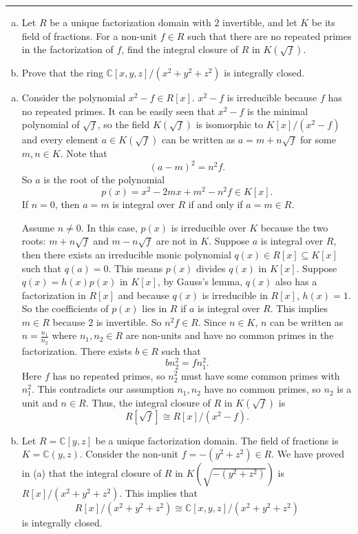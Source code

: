 \documentclass[letterpaper, 12pt]{article}
\begin{document}
\noindent\rule{7in}{2.8pt}
\begin{problem}{4}
\begin{enumerate}[(a)]
\item Let \(R\) be a unique factorization domain with \(2\) invertible, and let \(K\) be its field of fractions. For a non-unit \(f\in R\) such that there are no repeated primes in the factorization of \(f\), find the integral closure of \(R\) in \(K(\sqrt{f})\).
\item Prove that the ring \(\mathbb{C}[x,y,z]/(x^2+y^2+z^2)\) is integrally closed.
\end{enumerate}
\end{problem}
\begin{solution}
\begin{enumerate}[(a)]
\item Consider the polynomial \(x^2-f\in R[x]\). \(x^2-f\) is irreducible because \(f\) has no repeated primes. It can be easily seen that \(x^2-f\) is the minimal polynomial of \(\sqrt{f}\), so the field \(K(\sqrt{f})\) is isomorphic to \(K[x]/(x^2-f)\)  and every element \(a\in K(\sqrt{f})\) can be written as \(a=m+n\sqrt{f}\) for some \(m,n\in K\). Note that 
\[(a-m)^2=n^2f.\]
So \(a\) is the root of the polynomial 
\[p(x)=x^2-2mx+m^2-n^2f\in K[x].\]
If \(n=0\), then \(a=m\) is integral over \(R\) if and only if \(a=m\in R\). 

Assume \(n\neq 0\). In this case, \(p(x)\) is irreducible over \(K\) because the two roots: \(m+n\sqrt{f}\) and \(m-n\sqrt{f}\) are not in \(K\). Suppose \(a\) is integral over \(R\), then there exists an irreducible monic polynomial \(q(x)\in R[x]\subseteq K[x]\) such that \(q(a)=0\). This means \(p(x)\) divides \(q(x)\) in \(K[x]\). Suppose \(q(x)=h(x)p(x)\) in \(K[x]\), by Gauss's lemma, \(q(x)\) also has a factorization in \(R[x]\) and because \(q(x)\) is irreducible in \(R[x]\), \(h(x)=1\). So the coefficients of \(p(x)\) lies in \(R\) if \(a\) is integral over \(R\). This implies \(m\in R\) because \(2\) is invertible. So \(n^2f\in R\). Since \(n\in K\), \(n\) can be written as \(n=\frac{n_1}{n_2}\) where \(n_1,n_2\in R\) are non-units and have no common primes in the factorization. There exists \(b\in R\) such that 
\[bn_2^2=fn_1^2.\]
Here \(f\) has no repeated primes, so \(n_2^2\) must have some common primes with \(n_1^2\). This contradicts our assumption \(n_1,n_2\) have no common primes, so \(n_2\) is a unit and \(n\in R\). Thus, the integral closure of \(R\) in \(K(\sqrt{f})\) is 
\[R[\sqrt{f}]\cong R[x]/(x^2-f).\]
\item Let \(R=\mathbb{C}[y,z]\) be a unique factorization domain. The field of fractions is \(K=\mathbb{C}(y,z)\). Consider the non-unit \(f=-(y^2+z^2)\in R\). We have proved in (a) that the integral closure of \(R\) in \(K(\sqrt{-(y^2+z^2)})\) is \(R[x]/(x^2+y^2+z^2)\). This implies that 
\[R[x]/(x^2+y^2+z^2)\cong \mathbb{C}[x,y,z]/(x^2+y^2+z^2)\]
is integrally closed. 
\end{enumerate}
\end{solution}
\end{document}
